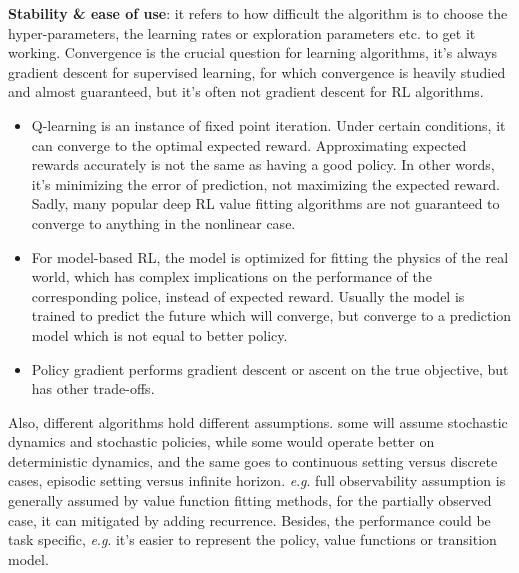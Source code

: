 \documentclass{tufte-handout}
\newcommand{\eg}{\textit{e}.\textit{g}. }
\begin{document}
\textbf{Stability \& ease of use}: it refers to how difficult the algorithm is to choose the hyper-parameters, the learning rates or exploration parameters etc. to get it working. Convergence is the crucial question for learning algorithms, it's always gradient descent for supervised learning, for which convergence is heavily studied and almost guaranteed, but it's often not gradient descent for RL algorithms.
\begin{itemize}
  \item Q-learning is an instance of fixed point iteration. Under certain conditions, it can converge to the optimal expected reward. Approximating expected rewards accurately is not the same as having a good policy. In other words, it's minimizing the error of prediction, not maximizing the expected reward. Sadly, many popular deep RL value fitting algorithms are not guaranteed to converge to anything in the nonlinear case.
  \item For model-based RL, the model is optimized for fitting the physics of the real world, which has complex implications on the performance of the corresponding police, instead of expected reward. Usually the model is trained to predict the future which will converge, but converge to a prediction model which is not equal to better policy.
  \item Policy gradient performs gradient descent or ascent on the true objective, but has other trade-offs.

\end{itemize}

Also, different algorithms hold different assumptions. some will assume stochastic dynamics and stochastic policies, while some would operate better on deterministic dynamics, and the same goes to continuous setting versus discrete cases, episodic setting versus infinite horizon. \eg full observability assumption is generally assumed by value function fitting methods, for the partially observed case, it can mitigated by adding recurrence.  Besides, the performance could be task specific, \eg it's easier to represent the policy, value functions or transition model.
\end{document}
